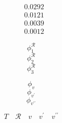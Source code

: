 \documentclass{article}
\begin{document}
\begin{align*}
& 0.0292\\
& 0.0121\\
& 0.0039\\
& 0.0012
\end{align*}


$$\phi^\mathcal{R}_1$$
$$\phi^\mathcal{R}_2$$
$$\phi^\mathcal{R}_3$$

$$\phi_v$$
$$\phi_{v^\prime}$$
$$\phi_{v^{\prime\prime}}$$

$$T
\quad
\mathcal{R}\quad
v\quad
v^\prime\quad
v^{\prime\prime}$$
\end{document}
